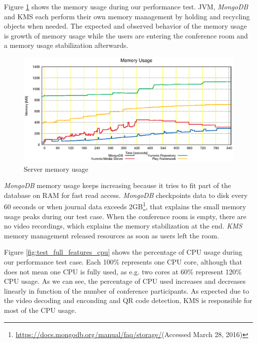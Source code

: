 \documentclass[10pt,conference]{IEEEtran}
\begin{document}
Figure \ref{fig:test_ram_fixed_mem} shows the memory usage during our performance test.
\gls{JVM}, \emph{MongoDB} and \gls{KMS} each perform their own memory management by holding and recycling objects when needed.
The expected and observed behavior of the memory usage is growth of memory usage while the users are entering the conference room and a memory usage stabilization afterwards.


\begin{figure}
  \centering
  \includegraphics[width=\linewidth]{stats/test_ram_fixed_mem.eps}
  \caption{Server memory usage}
  \label{fig:test_ram_fixed_mem}
\end{figure}

\emph{MongoDB} memory usage keeps increasing because it tries to fit part of the database on \gls{RAM} for fast read access.
\emph{MongoDB} checkpoints data to disk every 60 seconds or when journal data exceeds 2GB\footnote{\url{https://docs.mongodb.org/manual/faq/storage/}(Accessed March 28, 2016)}, that explains the small memory usage peaks during our test case.
When the conference room is empty, there are no video recordings, which explains the memory stabilization at the end.
\emph{KMS} memory management released resources as soon as users left the room. 


Figure \ref{fig:test_full_features_cpu} shows the percentage of \gls{CPU} usage during our performance test case. 
Each 100\% represents one \gls{CPU} core, although that does not mean one \gls{CPU} is fully used, as e.g. two cores at 60\% represent 120\% \gls{CPU} usage.
As we can see, the percentage of \gls{CPU} used increases and decreases linearly in function of the number of conference participants.
As expected due to the video decoding and enconding and \gls{QR} code detection, \gls{KMS} is responsible for most of the \gls{CPU} usage.
\end{document}
